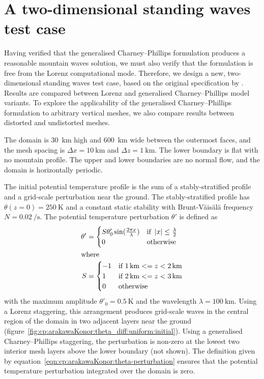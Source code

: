 \section{A two-dimensional standing waves test case}
\label{sec:cp:arakawaKonor}

Having verified that the generalised Charney--Phillips formulation produces a reasonable mountain waves solution, we must also verify that the formulation is free from the Lorenz computational mode.
Therefore, we design a new, two-dimensional standing waves test case, based on the original specification by \citet{arakawa-konor1996}.
Results are compared between Lorenz and generalised Charney--Phillips model variants.
To explore the applicability of the generalised Charney--Phillips formulation to arbitrary vertical meshes, we also compare results between distorted and undistorted meshes.

The domain is \SI{30}{\kilo\meter} high and \SI{600}{\kilo\meter} wide between the outermost faces, and the mesh spacing is $\Delta x = \SI{10}{\kilo\meter}$ and $\Delta z = \SI{1}{\kilo\meter}$.  The lower boundary is flat with no mountain profile.
The upper and lower boundaries are no normal flow, and the domain is horizontally periodic.

The initial potential temperature profile is the sum of a stably-stratified profile and a grid-scale perturbation near the ground.
The stably-stratified profile has $\theta(z = 0) = \SI{250}{\kelvin}$ and a constant static stability with Brunt-V\"ais\"al\"a frequency $N = \SI{0.02}{\per\second}$.
The potential temperature perturbation $\theta'$ is defined as
\begin{subequations}
\label{eqn:cp:arakawaKonor:theta-perturbation}
\begin{align}
	\theta' &= \begin{cases} S \theta'_0 \sin(\frac{2 \pi x}{\lambda}) & \text{if } \left\lvert x \right\rvert \leq \frac{\lambda}{2} \\
		0 & \text{otherwise} \\
	\end{cases} \\
\shortintertext{where}
	S &= \begin{cases}
		-1 & \text{if } \SI{1}{\kilo\meter} <= z < \SI{2}{\kilo\meter} \\
		1 & \text{if } \SI{2}{\kilo\meter} <= z < \SI{3}{\kilo\meter} \\
		0 & \text{otherwise} \\
	\end{cases}
\end{align}
\end{subequations}
with the maximum amplitude $\theta'_0 = \SI{0.5}{\kelvin}$ and the wavelength $\lambda = \SI{100}{\kilo\meter}$.
Using a Lorenz staggering, this arrangement produces grid-scale waves in the central region of the domain in two adjacent layers near the ground (figure~\ref{fig:cp:arakawaKonor:theta_diff:uniform:initial}).
Using a generalised Charney--Phillips staggering, the perturbation is non-zero at the lowest two interior mesh layers above the lower boundary (not shown).
The definition given by equation~\eqref{eqn:cp:arakawaKonor:theta-perturbation} ensures that the potential temperature perturbation integrated over the domain is zero.


